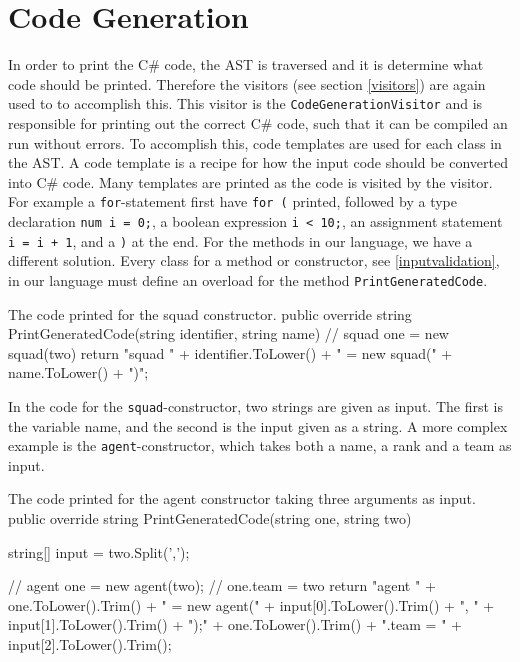 \section{Code Generation}
In order to print the C\# code, the AST is traversed and it is determine what code should be printed. 
Therefore the visitors (see section \ref{visitors}) are again used to to accomplish this.
This visitor is the \texttt{CodeGenerationVisitor} and is responsible for printing out the correct C\# code, such that it can be compiled an run without errors. 
To accomplish this, code templates are used for each class in the AST. \newline
A code template is a recipe for how the input code should be converted into C\# code. 
Many templates are printed as the code is visited by the visitor. 
For example a \texttt{for}-statement first have \texttt{for (} printed, followed by a type declaration \texttt{num i = 0;}, a boolean expression \texttt{i < 10;}, an assignment statement \texttt{i = i + 1}, and a \texttt{)} at the end.\newline
For the methods in our language, we have a different solution. 
Every class for a method or constructor, see \ref{inputvalidation}, in our language must define an overload for the method \texttt{PrintGeneratedCode}. 

\begin{source}{The code printed for the squad constructor.}{}
public override string PrintGeneratedCode(string identifier, string name)
        {
            // squad one = new squad(two)
            return "squad " + identifier.ToLower() + " = new squad(" + name.ToLower() + ")";
        }
\end{source}

In the code for the \texttt{squad}-constructor, two strings are given as input. 
The first is the variable name, and the second is the input given as a string. 
A more complex example is the \texttt{agent}-constructor, which takes both a name, a rank and a team as input.

\begin{source}{The code printed for the agent constructor taking three arguments as input.}{}
public override string PrintGeneratedCode(string one, string two)
        {
            string[] input = two.Split(',');
						
            // agent one = new agent(two);
            // one.team = two
            return "agent " + one.ToLower().Trim() + 
							" = new agent(" + input[0].ToLower().Trim() + 
							", " + input[1].ToLower().Trim() + ");\n" + 
							one.ToLower().Trim() + ".team = " + 
							input[2].ToLower().Trim();
        }
\end{source}

